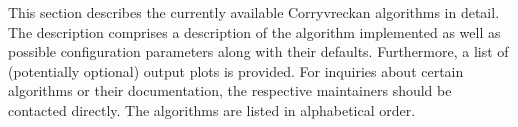 This section describes the currently available Corryvreckan algorithms in detail.
The description comprises a description of the algorithm implemented as well as possible configuration parameters along with their defaults.
Furthermore, a list of (potentially optional) output plots is provided.
For inquiries about certain algorithms or their documentation, the respective maintainers should be contacted directly.
The algorithms are listed in alphabetical order.
